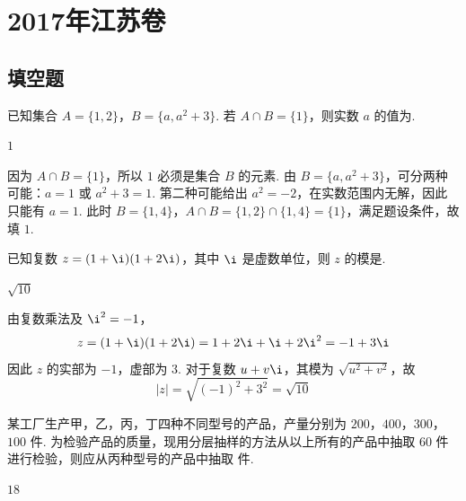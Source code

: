 
\chapter{2017年江苏卷}

\section{填空题}

\begin{problem}
已知集合 \(A=\{1,2\}\)，\(B=\{a,a^2+3\}\). 若 \(A\cap B=\{1\}\)，则实数 \(a\) 的值为\fillinblank{}.
\end{problem}

\begin{answer}
\(1\)
\end{answer}

\begin{solution}
因为 \(A\cap B=\{1\}\)，所以 \(1\) 必须是集合 \(B\) 的元素. 由 \(B=\{a,a^2+3\}\)，可分两种可能：\(a=1\) 或 \(a^2+3=1\). 第二种可能给出 \(a^2=-2\)，在实数范围内无解，因此只能有 \(a=1\). 此时 \(B=\{1,4\}\)，\(A\cap B=\{1,2\}\cap\{1,4\}=\{1\}\)，满足题设条件，故填 \(1\).
\end{solution}



\begin{problem}
已知复数 \(z=(1+\i)(1+2\i)\)，其中 \(\i\) 是虚数单位，则 \(z\) 的模是\fillinblank{}.
\end{problem}

\begin{answer}
\(\sqrt{10}\)
\end{answer}

\begin{solution}
由复数乘法及 \(\i^2=-1\)，
\[
z=(1+\i)(1+2\i)=1+2\i+\i+2\i^2=-1+3\i
\]
因此 \(z\) 的实部为 \(-1\)，虚部为 \(3\). 对于复数 \(u+v\i\)，其模为 \(\sqrt{u^2+v^2}\)，故
\[
|z|=\sqrt{(-1)^2+3^2}=\sqrt{10}
\]
\end{solution}



\begin{problem}
某工厂生产甲，乙，丙，丁四种不同型号的产品，产量分别为 \(200\)，\(400\)，\(300\)，\(100\) 件. 为检验产品的质量，现用分层抽样的方法从以上所有的产品中抽取 \(60\) 件进行检验，则应从丙种型号的产品中抽取\fillinblank{} 件.
\end{problem}

\begin{answer}
\(18\)
\end{answer}

